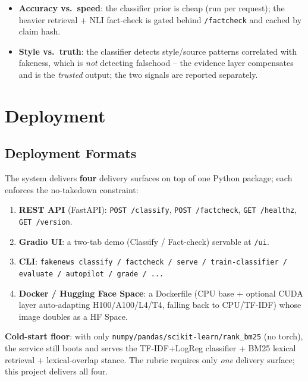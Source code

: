 \documentclass[12pt,a4paper]{article}
\begin{document}
\begin{itemize}\setlength\itemsep{0.15em}
  \item \textbf{Accuracy vs.\ speed}: the classifier prior is cheap (run per request); the heavier retrieval + NLI fact-check is gated behind \texttt{/factcheck} and cached by claim hash.
  \item \textbf{Style vs.\ truth}: the classifier detects style/source patterns correlated with fakeness, which is \emph{not} detecting falsehood -- the evidence layer compensates and is the \emph{trusted} output; the two signals are reported separately.
\end{itemize}

\section{Deployment}

\subsection{Deployment Formats}

The system delivers \textbf{four} delivery surfaces on top of one Python package; each enforces the no-takedown constraint:
\begin{enumerate}
  \item \textbf{REST API} (FastAPI): \texttt{POST /classify}, \texttt{POST /factcheck}, \texttt{GET /healthz}, \texttt{GET /version}.
  \item \textbf{Gradio UI}: a two-tab demo (Classify / Fact-check) servable at \texttt{/ui}.
  \item \textbf{CLI}: \texttt{fakenews classify / factcheck / serve / train-classifier / evaluate / autopilot / grade / ...}
  \item \textbf{Docker / Hugging Face Space}: a Dockerfile (CPU base + optional CUDA layer auto-adapting H100/A100/L4/T4, falling back to CPU/TF-IDF) whose image doubles as a HF Space.
\end{enumerate}

\noindent \textbf{Cold-start floor}: with only \texttt{numpy/pandas/scikit-learn/rank\_bm25} (no torch), the service still boots and serves the TF-IDF+LogReg classifier + BM25 lexical retrieval + lexical-overlap stance. The rubric requires only \emph{one} delivery surface; this project delivers all four.
\end{document}
